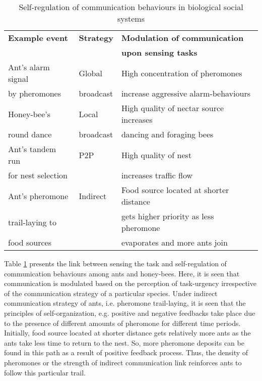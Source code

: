 \begin{table}
\caption{Self-regulation of communication behaviours in biological social systems}
\label{table:bio-comm-task-urgency}
\begin{center}
\begin{tabular}{|l|l|l|}
\hline \textbf{Example event} & \textbf{Strategy} & \textbf{Modulation of communication}\\
&  &  \textbf{upon sensing tasks}\\
\hline Ant's alarm signal &  Global  & High concentration of pheromones\\
by pheromones & broadcast &  increase aggressive alarm-behaviours \\                                                                                                                                               
\hline Honey-bee's  & Local  &  High quality of nectar source increases \\
round dance & broadcast & dancing and foraging bees\\
\hline Ant's tandem run     & P2P & High quality of nest \\
for nest selection & &   increases traffic flow\\
\hline Ant's pheromone   & Indirect & Food source located at shorter distance\\
trail-laying to   & &  gets higher priority as less pheromone \\
food sources & & evaporates and more ants join\\
\hline
\end{tabular}
\end{center}
\end{table}
Table \ref{table:bio-comm-task-urgency} presents the link between sensing the task and self-regulation of communication behaviours among ants and honey-bees. Here, it is seen that communication is modulated based on the perception of  task-urgency irrespective of the communication strategy of a particular species. Under indirect communication strategy of ants, i.e. pheromone trail-laying, it is seen that the principles of self-organization, e.g. positive and negative feedbacks take place due to the presence of different amounts of pheromone for different time periods. Initially, food source located at shorter distance gets relatively more ants  as the ants take less time to return to the nest. So, more pheromone deposits can be found in this path as a result of positive feedback process.  Thus, the density of pheromones or the strength of indirect communication link reinforces ants to follow this particular trail.

